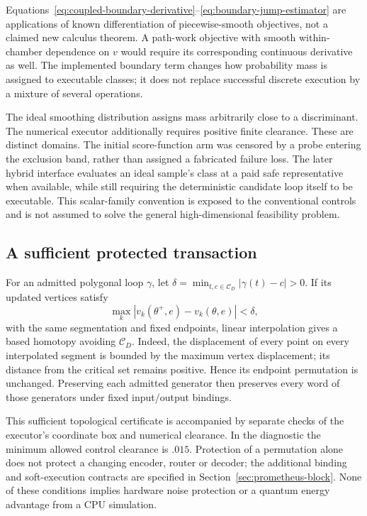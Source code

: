 Equations~\eqref{eq:coupled-boundary-derivative}--\eqref{eq:boundary-jump-estimator}
are applications of known differentiation of piecewise-smooth objectives,
not a claimed new calculus theorem. A path-work objective with smooth
within-chamber dependence on $v$ would require its corresponding continuous
derivative as well. The implemented boundary term changes how probability
mass is assigned to executable classes; it does not replace successful
discrete execution by a mixture of several operations.

The ideal smoothing distribution assigns mass arbitrarily close to a
discriminant. The numerical executor additionally requires positive finite
clearance. These are distinct domains. The initial score-function arm was
censored by a probe entering the exclusion band, rather than assigned a
fabricated failure loss. The later hybrid interface evaluates an ideal
sample's class at a paid safe representative when available, while still
requiring the deterministic candidate loop itself to be executable. This
scalar-family convention is exposed to the conventional controls and is not
assumed to solve the general high-dimensional feasibility problem.

\subsection{A sufficient protected transaction}

For an admitted polygonal loop $\gamma$, let
$\delta=\min_{t,c\in\mathcal C_D}|\gamma(t)-c|>0$. If its updated vertices
satisfy
\begin{equation}
 \max_k|v_k(\theta^+,e)-v_k(\theta,e)|<\delta,
 \label{eq:protected-vertex-transaction}
\end{equation}
with the same segmentation and fixed endpoints, linear interpolation gives a
based homotopy avoiding $\mathcal C_D$. Indeed, the displacement of every
point on every interpolated segment is bounded by the maximum vertex
displacement; its distance from the critical set remains positive. Hence its
endpoint permutation is unchanged. Preserving each admitted generator then
preserves every word of those generators under fixed input/output bindings.

This sufficient topological certificate is accompanied by separate checks of
the executor's coordinate box and numerical clearance. In the diagnostic the
minimum allowed control clearance is $.015$. Protection of a permutation
alone does not protect a changing encoder, router or decoder; the additional
binding and soft-execution contracts are specified in
Section~\ref{sec:prometheus-block}. None of these conditions implies hardware
noise protection or a quantum energy advantage from a CPU simulation.

